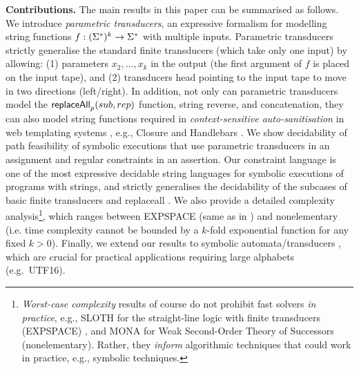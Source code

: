 \smallskip
\noindent
\textbf{Contributions.} The main results in this paper can be summarised
as follows. We introduce \emph{parametric 
transducers}, an expressive formalism for modelling string functions 
$f: (\Sigma^*)^k \to \Sigma^*$ with multiple inputs. Parametric
transducers strictly generalise the standard finite transducers (which take only
one input) by allowing: (1) parameters $x_2,\ldots,x_k$ in the output
(the first argument of $f$ is placed on the input tape), 
and (2) transducers head pointing to the input tape to move in two directions
(left/right). In addition, not only can parametric
transducers model the $\mathsf{replaceAll}_p(sub,rep)$ function, string reverse, and
concatenation,
they can also model string functions required in \emph{context-sensitive
auto-sanitisation} in web templating systems \cite{SSS11}, e.g., Closure 
\cite{Closure} and Handlebars \cite{Handlebars}.  We show decidability of path 
feasibility of symbolic executions that use parametric transducers in an 
assignment and regular constraints in an assertion. Our constraint language
is one of the most expressive decidable string languages for symbolic executions
of programs with strings, and strictly generalises 
the decidability of the subcases of basic finite transducers \cite{LB16}
and replaceall \cite{CCHLW18}. We also provide a detailed complexity 
analysis\footnote{
\emph{Worst-case complexity} results of course do not prohibit fast solvers 
\emph{in practice}, e.g., SLOTH for the straight-line 
logic with finite transducers (EXPSPACE) 
\cite{HJLRV18}, and MONA for Weak Second-Order
Theory of Successors (nonelementary). Rather, they
\emph{inform} algorithmic techniques that could work in practice, e.g., 
symbolic techniques.},
which ranges between EXPSPACE (same as in \cite{LB16,CCHLW18}) and
nonelementary (i.e. time complexity cannot be bounded by a $k$-fold exponential
function for any fixed $k > 0$). 
Finally, we extend our results to symbolic automata/transducers
\cite{BEK,symbolic-transducer,DV13,symbolic-transducer-power}, which are crucial for practical 
applications requiring large alphabets (e.g.~UTF16).


